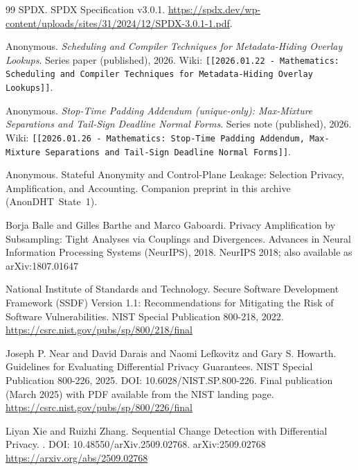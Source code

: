 \documentclass[11pt]{article}
\begin{document}
\begin{thebibliography}{99}
SPDX.
\newblock SPDX Specification v3.0.1.
\newblock \url{https://spdx.dev/wp-content/uploads/sites/31/2024/12/SPDX-3.0.1-1.pdf}.


Anonymous.
\newblock \emph{Scheduling and Compiler Techniques for Metadata-Hiding Overlay Lookups}.
\newblock Series paper (published), 2026.
\newblock Wiki: \texttt{[[2026.01.22 - Mathematics: Scheduling and Compiler Techniques for Metadata-Hiding Overlay Lookups]]}.

Anonymous.
\newblock \emph{Stop-Time Padding Addendum (unique-only): Max-Mixture Separations and Tail-Sign Deadline Normal Forms}.
\newblock Series note (published), 2026.
\newblock Wiki: \texttt{[[2026.01.26 - Mathematics: Stop-Time Padding Addendum, Max-Mixture Separations and Tail-Sign Deadline Normal Forms]]}.

Anonymous.
\newblock Stateful Anonymity and Control-Plane Leakage: Selection Privacy, Amplification, and Accounting.
\newblock Companion preprint in this archive (AnonDHT~State~1).

Borja Balle and Gilles Barthe and Marco Gaboardi.
\newblock Privacy Amplification by Subsampling: Tight Analyses via Couplings and Divergences.
\newblock Advances in Neural Information Processing Systems (NeurIPS), 2018.
\newblock NeurIPS 2018; also available as arXiv:1807.01647

{National Institute of Standards and Technology}.
\newblock Secure Software Development Framework (SSDF) Version 1.1: Recommendations for Mitigating the Risk of Software Vulnerabilities.
\newblock NIST Special Publication 800-218, 2022.
\newblock \url{https://csrc.nist.gov/pubs/sp/800/218/final}

Joseph P. Near and David Darais and Naomi Lefkovitz and Gary S. Howarth.
\newblock Guidelines for Evaluating Differential Privacy Guarantees.
\newblock NIST Special Publication 800-226, 2025.
\newblock DOI: 10.6028/NIST.SP.800-226.
\newblock Final publication (March 2025) with PDF available from the NIST landing page.
\newblock \url{https://csrc.nist.gov/pubs/sp/800/226/final}

Liyan Xie and Ruizhi Zhang.
\newblock Sequential Change Detection with Differential Privacy.
.
\newblock DOI: 10.48550/arXiv.2509.02768.
\newblock arXiv:2509.02768
\newblock \url{https://arxiv.org/abs/2509.02768}


\end{thebibliography}
\end{document}
